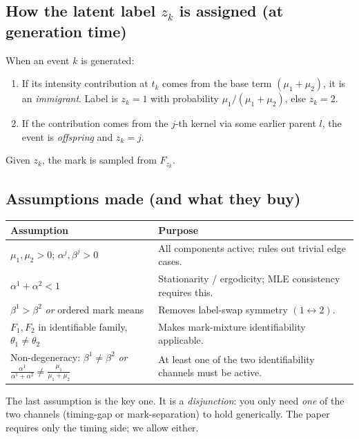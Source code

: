 \documentclass[11pt]{article}
\begin{document}
\subsection{How the latent label $z_k$ is assigned (at generation time)}

When an event $k$ is generated:
\begin{enumerate}[leftmargin=*,nosep]
\item If its intensity contribution at $t_k$ comes from the base term $(\mu_1 + \mu_2)$, it is an \emph{immigrant}. Label is $z_k = 1$ with probability $\mu_1 / (\mu_1+\mu_2)$, else $z_k = 2$.
\item If the contribution comes from the $j$-th kernel via some earlier parent $l$, the event is \emph{offspring} and $z_k = j$.
\end{enumerate}
Given $z_k$, the mark is sampled from $F_{z_k}$.

\subsection{Assumptions made (and what they buy)}

\begin{center}
\begin{tabular}{@{}lp{9.5cm}@{}}
\toprule
Assumption & Purpose \\
\midrule
$\mu_1, \mu_2 > 0$; $\alpha^j, \beta^j > 0$                & All components active; rules out trivial edge cases. \\
$\alpha^1 + \alpha^2 < 1$                                   & Stationarity / ergodicity; MLE consistency requires this. \\
$\beta^1 > \beta^2$ \emph{or} ordered mark means             & Removes label-swap symmetry $(1 \leftrightarrow 2)$. \\
$F_1, F_2$ in identifiable family, $\theta_1 \ne \theta_2$   & Makes mark-mixture identifiability applicable. \\
Non-degeneracy: $\beta^1 \ne \beta^2$ \emph{or} $\frac{\alpha^1}{\alpha^1+\alpha^2} \ne \frac{\mu_1}{\mu_1+\mu_2}$ & At least one of the two identifiability channels must be active. \\
\bottomrule
\end{tabular}
\end{center}

The last assumption is the key one. It is a \emph{disjunction}: you only need \emph{one} of the two channels (timing-gap or mark-separation) to hold generically. The paper requires only the timing side; we allow either.
\end{document}
